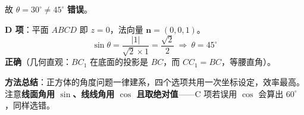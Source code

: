 \begin{answer}
故 $\theta=30^\circ\ne45^\circ$  \textbf{错误}。

\par\medskip

\textbf{D 项}：平面 $ABCD$ 即 $z=0$，法向量 $\boldsymbol n=(0,0,1)$。
\nopagebreak[4]
\[\sin\theta=\frac{|1|}{\sqrt2\times1}=\frac{\sqrt2}2\ \Longrightarrow\ \theta=45^\circ\]
 \textbf{正确}（几何直观：$BC_1$ 在底面的投影是 $BC$，而 $CC_1=BC$，等腰直角）。

\begin{gktip}
\textbf{方法总结}：正方体的角度问题一律建系，四个选项共用一次坐标设定，效率最高。注意\textbf{线面角用 $\sin$、线线角用 $\cos$ 且取绝对值}——C 项若误用 $\cos$ 会算出 $60^\circ$，同样选错。
\end{gktip}


\par\medskip

\end{answer}
